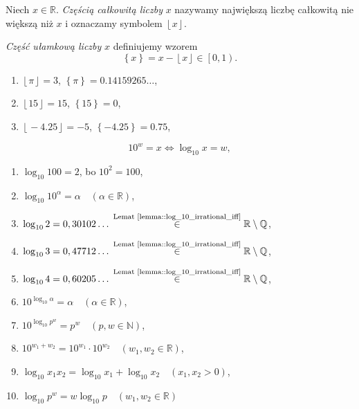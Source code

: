 \documentclass[aspectratio=169]{beamer}
\newcommand{\enumsymbol}{$\triangleright$}
\newcommand{\R}{\mathbb{R}}
\newcommand{\Q}{\mathbb{Q}}
\newcommand{\N}{\mathbb{N}}
\newcommand{\define}[1]{\textit{#1}}
\newcommand{\paren}[1]{\!\left(#1 \right)}
\newcommand{\floor}[1]{\left\lfloor{} #1 \right\rfloor}
\newcommand{\fracpart}[1]{\left\{ #1 \right\}}
\begin{document}
\begin{frame}
\begin{definition}
Niech $x \in \R$.
\define{Częścią całkowitą liczby} $x$ nazywamy największą liczbę całkowitą nie większą niż $x$ i oznaczamy symbolem $\floor{x}$.

\define{Część ułamkową liczby} $x$ definiujemy wzorem
\begin{equation*}
\fracpart{x} = x-\floor{x} \in \left[0, 1\right).
\end{equation*}
\end{definition}
\begin{example}
  \begin{enumerate}[label=\enumsymbol]
    \item $\floor{\pi} = 3$, $\fracpart{\pi} = 0.14159265\ldots{}$,
    \item $\floor{15} = 15$, $\fracpart{15} = 0$,
    \item $\floor{-4.25} = -5$, $\fracpart{-4.25} = 0.75$, 
  \end{enumerate}
\end{example}
\end{frame}

\begin{frame}
  \begin{equation*}
    10^w = x \iff \log_{10}x = w,
  \end{equation*}
  \begin{enumerate}[label=\enumsymbol]
    \item $\log_{10}100 = 2$, bo $10^2 = 100$,
    \item $\log_{10}10^\alpha = \alpha \quad \paren{\alpha \in \R}$,
    \item $\log_{10}2 = 0,30102\ldots{} \stackrel{\text{Lemat~\ref{lemma::log_10_irrational_iff}}}{\in} \R \setminus \Q$,
    \item $\log_{10}3 = 0,47712\ldots{} \stackrel{\text{Lemat~\ref{lemma::log_10_irrational_iff}}}{\in} \R \setminus \Q$,
    \item $\log_{10}4 = 0,60205\ldots{} \stackrel{\text{Lemat~\ref{lemma::log_10_irrational_iff}}}{\in} \R \setminus \Q$,
    \item $10^{\log_{10}\alpha} = \alpha \quad \paren{\alpha \in \R}$,
    \item $10^{\log_{10}p^w} = p^w \quad \paren{p, w \in \N}$,
    \item $10^{w_1+w_2} = 10^{w_1} \cdot 10^{w_2} \quad \paren{w_1, w_2 \in \R}$,
    \item $\log_{10} x_1 x_2 = \log_{10}x_1+\log_{10}x_2 \quad \paren{x_1, x_2 > 0}$,
    \item $\log_{10}{p^w} = w \log_{10}p  \quad \paren{w_1, w_2 \in \R}$
  \end{enumerate}
\end{frame}
\end{document}
